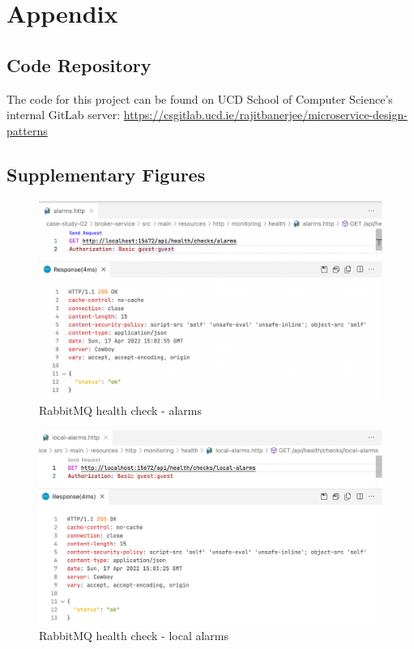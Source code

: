 \chapter{Appendix}


\section{Code Repository}

The code for this project can be found on UCD School of Computer Science's internal GitLab server: \url{https://csgitlab.ucd.ie/rajitbanerjee/microservice-design-patterns}

\section{Supplementary Figures}

\begin{figure}[H]
	\centering
	\includegraphics[width=1.0\linewidth]{./assets/images/case-studies/cs02-hc1.png}
	\caption{RabbitMQ health check - alarms}
	\label{fig:cs02-hc1}
\end{figure}


\begin{figure}[H]
	\centering
	\includegraphics[width=1.0\linewidth]{./assets/images/case-studies/cs02-hc2.png}
	\caption{RabbitMQ health check - local alarms}
	\label{fig:cs02-hc2}
\end{figure}


